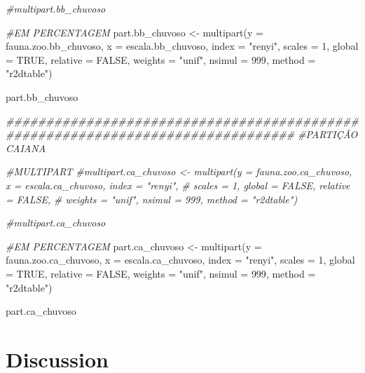 \documentclass[
  letterpaper,
  DIV=11,
  numbers=noendperiod]{scrartcl}
\newenvironment{Shaded}{}{}
\newcommand{\AttributeTok}[1]{\textcolor[rgb]{0.49,0.56,0.16}{#1}}
\newcommand{\CommentTok}[1]{\textcolor[rgb]{0.38,0.63,0.69}{\textit{#1}}}
\newcommand{\ConstantTok}[1]{\textcolor[rgb]{0.53,0.00,0.00}{#1}}
\newcommand{\DecValTok}[1]{\textcolor[rgb]{0.25,0.63,0.44}{#1}}
\newcommand{\DocumentationTok}[1]{\textcolor[rgb]{0.73,0.13,0.13}{\textit{#1}}}
\newcommand{\FunctionTok}[1]{\textcolor[rgb]{0.02,0.16,0.49}{#1}}
\newcommand{\NormalTok}[1]{#1}
\newcommand{\OtherTok}[1]{\textcolor[rgb]{0.00,0.44,0.13}{#1}}
\newcommand{\StringTok}[1]{\textcolor[rgb]{0.25,0.44,0.63}{#1}}
\begin{document}
\begin{Shaded}
\begin{Highlighting}[numbers=left,,]
\CommentTok{\#multipart.bb\_chuvoso}


\CommentTok{\#EM PERCENTAGEM}
\NormalTok{part.bb\_chuvoso }\OtherTok{\textless{}{-}} \FunctionTok{multipart}\NormalTok{(}\AttributeTok{y =}\NormalTok{ fauna.zoo.bb\_chuvoso, }\AttributeTok{x =}\NormalTok{ escala.bb\_chuvoso, }\AttributeTok{index =} \StringTok{"renyi"}\NormalTok{,}
                          \AttributeTok{scales =} \DecValTok{1}\NormalTok{, }\AttributeTok{global =} \ConstantTok{TRUE}\NormalTok{, }\AttributeTok{relative =} \ConstantTok{FALSE}\NormalTok{,}
                          \AttributeTok{weights =} \StringTok{"unif"}\NormalTok{, }\AttributeTok{nsimul =} \DecValTok{999}\NormalTok{, }\AttributeTok{method =} \StringTok{"r2dtable"}\NormalTok{)}

\NormalTok{part.bb\_chuvoso}

\DocumentationTok{\#\#\#\#\#\#\#\#\#\#\#\#\#\#\#\#\#\#\#\#\#\#\#\#\#\#\#\#\#\#\#\#\#\#\#\#\#\#\#\#\#\#\#\#\#\#\#\#\#\#\#\#\#\#\#\#\#\#\#\#\#\#\#\#\#\#\#\#\#\#\#\#\#\#\#\#\#\#\#\#}
\CommentTok{\#PARTIÇÃO CAIANA}

\CommentTok{\#MULTIPART}
\CommentTok{\#multipart.ca\_chuvoso \textless{}{-} multipart(y = fauna.zoo.ca\_chuvoso, x = escala.ca\_chuvoso, index = "renyi",}
\CommentTok{\#                          scales = 1, global = FALSE, relative = FALSE,}
\CommentTok{\#                          weights = "unif", nsimul = 999, method = "r2dtable")}

\CommentTok{\#multipart.ca\_chuvoso}


\CommentTok{\#EM PERCENTAGEM}
\NormalTok{part.ca\_chuvoso }\OtherTok{\textless{}{-}} \FunctionTok{multipart}\NormalTok{(}\AttributeTok{y =}\NormalTok{ fauna.zoo.ca\_chuvoso, }\AttributeTok{x =}\NormalTok{ escala.ca\_chuvoso, }\AttributeTok{index =} \StringTok{"renyi"}\NormalTok{,}
                          \AttributeTok{scales =} \DecValTok{1}\NormalTok{, }\AttributeTok{global =} \ConstantTok{TRUE}\NormalTok{, }\AttributeTok{relative =} \ConstantTok{FALSE}\NormalTok{,}
                          \AttributeTok{weights =} \StringTok{"unif"}\NormalTok{, }\AttributeTok{nsimul =} \DecValTok{999}\NormalTok{, }\AttributeTok{method =} \StringTok{"r2dtable"}\NormalTok{)}

\NormalTok{part.ca\_chuvoso}
\end{Highlighting}
\end{Shaded}

\section{Discussion}\label{discussion}
\end{document}
